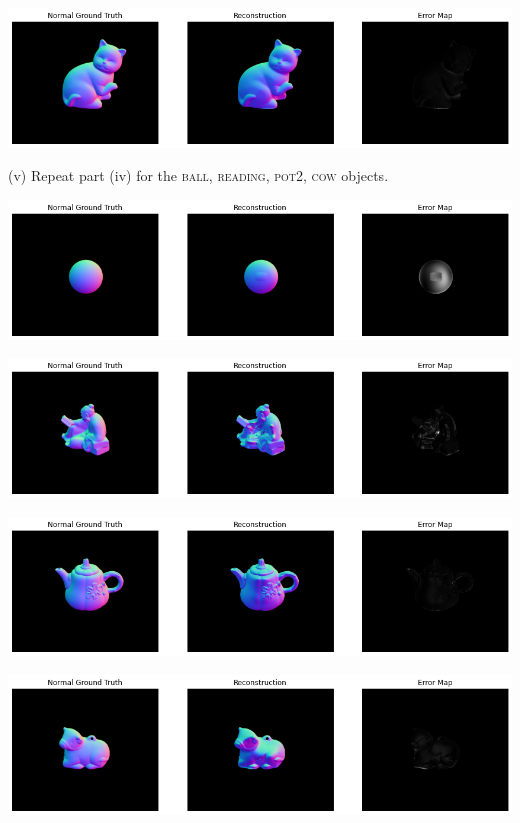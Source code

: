 \documentclass[answers]{exam}
\begin{document}
\begin{solution}
\begin{center}
    \includegraphics[scale=0.45]{Images/cat.png}
\end{center}
\end{solution}
(v) Repeat part (iv) for the \textsc{ball}, \textsc{reading}, \textsc{pot2}, \textsc{cow} objects.
\begin{solution}
    \begin{center}
        \includegraphics[scale=0.45]{Images/ball.png}
    \end{center}
    \begin{center}
        \includegraphics[scale=0.45]{Images/reading.png}
    \end{center}
    \begin{center}
        \includegraphics[scale=0.45]{Images/pot2.png}
    \end{center}
    \begin{center}
        \includegraphics[scale=0.45]{Images/cow.png}
    \end{center}
\end{solution}
\end{document}

